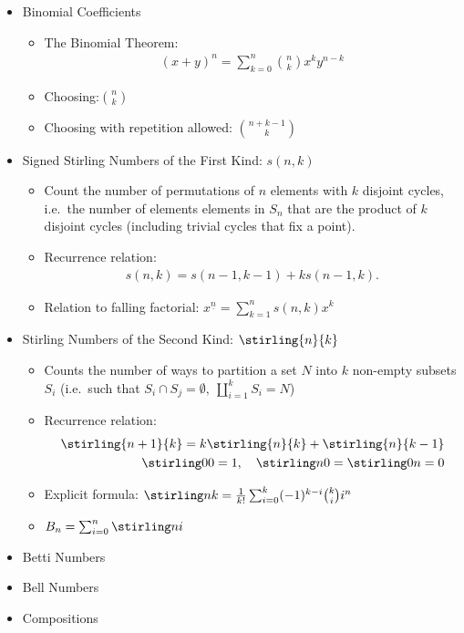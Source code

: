 \begin{itemize}
\tightlist
\item
  Binomial Coefficients

  \begin{itemize}
  \tightlist
  \item
    The Binomial Theorem:
    \begin{align*}
      (x+y)^n = \sum_{k=0}^n {n\choose k}x^ky^{n-k}
      \end{align*}
  \item
    Choosing:\(n \choose k\)
  \item
    Choosing with repetition allowed: \({n+k-1}\choose k\)
  \end{itemize}
\item
  Signed Stirling Numbers of the First Kind: \(s(n,k)\)

  \begin{itemize}
  \tightlist
  \item
    Count the number of permutations of \(n\) elements with \(k\)
    disjoint cycles, i.e.~the number of elements elements in \(S_n\)
    that are the product of \(k\) disjoint cycles (including trivial
    cycles that fix a point).
  \item
    Recurrence relation:
    \begin{align*}  
      s(n,k) = s(n-1, k-1) + ks(n-1, k)
      .\end{align*}
  \item
    Relation to falling factorial:
    \(x^{\underline n} = \sum_{k=1}^n s(n,k)x^k\)
  \end{itemize}
\item
  Stirling Numbers of the Second Kind: \(\stirling{n}{k}\)

  \begin{itemize}
  \tightlist
  \item
    Counts the number of ways to partition a set \(N\) into \(k\)
    non-empty subsets \(S_i\) (i.e.~such that
    \(S_i \cap S_j = \emptyset,~\coprod_{i=1}^k S_i = N\))
  \item
    Recurrence relation:
    \begin{align*}
      \stirling{n+1}{k} = k\stirling{n}{k} + \stirling{n}{k-1} \\ 
      \stirling 0 0 = 1,
      \quad \stirling n 0 = \stirling 0 n = 0
      \end{align*}
  \item
    Explicit formula:
    \(\stirling n k = \frac 1 {k!} \sum_{i=0}^k (-1)^{k-i} {k \choose i} i^n\)
  \item
    \(B_n = \sum_{i=0}^n \stirling n i\)
  \end{itemize}
\item
  Betti Numbers
\item
  Bell Numbers
\item
  Compositions


\end{itemize}
